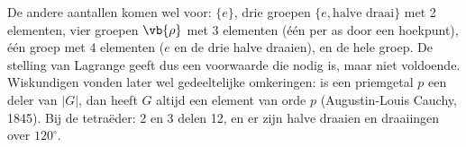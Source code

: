 De andere aantallen komen wel voor: $\{e\}$, drie groepen $\{e, \text{halve draai}\}$ met 2 elementen, vier groepen $\vb{\rho}$ met 3 elementen (één per as door een hoekpunt), één groep met 4 elementen ($e$ en de drie halve draaien), en de hele groep. De stelling van Lagrange geeft dus een voorwaarde die nodig is, maar niet voldoende. Wiskundigen vonden later wel gedeeltelijke omkeringen: is een priemgetal $p$ een deler van $|G|$, dan heeft $G$ altijd een element van orde $p$ (Augustin-Louis Cauchy, 1845). Bij de tetraëder: 2 en 3 delen 12, en er zijn halve draaien en draaiingen over $120^\circ$.

\opdrachtenkop

\begin{oefeningen}





















\end{oefeningen}



